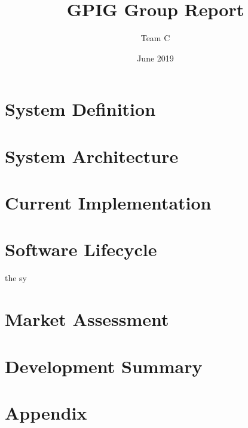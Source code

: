 \documentclass{UoYCSproject}
\title{GPIG Group Report}
\author{Team C}
\date{June 2019}
\begin{document}
\maketitle
{}
\chapter{System Definition} \label{systemdef}


\chapter{System Architecture} \label{systemarch}


\chapter{Current Implementation} \label{currentimp}


\chapter{Software Lifecycle} \label{softwarelife}
the sy

\chapter{Market Assessment} \label{market}


\chapter{Development Summary} \label{devsummary}


\appendix
\chapter{Appendix}
\end{document}
